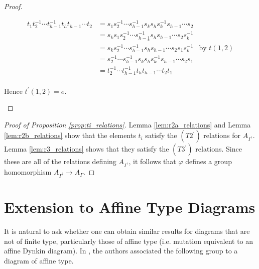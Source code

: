 \documentclass[11pt]{amsart}
\theoremstyle{definition}
\begin{document}
\begin{proof}
\begin{enumerate}[a)]
\begin{align*}
t_1t_2^{-1}\cdots t_{h-1}^{-1}t_ht_{h-1}\cdots t_2 &= s_1s_2^{-1}\cdots s_{h-1}^{-1}s_ks_hs_k^{-1}s_{h-1}\cdots s_2\\
&= s_k\underline{s_1s_2^{-1}\cdots s_{h-1}^{-1}s_hs_{h-1}\cdots s_2}s_k^{-1}\\
&= s_ks_2^{-1}\cdots s_{h-1}^{-1}s_hs_{h-1}\cdots s_2s_1s_k^{-1} &\text{by } t(1,2)\\
&= s_2^{-1}\cdots s_{h-1}^{-1}s_ks_hs_k^{-1}s_{h-1}\cdots s_2s_1\\
&= t_2^{-1}\cdots t_{h-1}^{-1}t_ht_{h-1}\cdots t_2t_1\\
\end{align*}

\noindent Hence $t^\prime(1,2) = e$.
\end{enumerate}
\end{proof}


\begin{proof}[Proof of Proposition \ref{prop:ti_relations}]
Lemma \ref{lem:r2a_relations} and Lemma \ref{lem:r2b_relations} show that the elements $t_i$ satisfy the $(T2^\prime)$ relations for $A_{\Gamma^\prime}$. Lemma \ref{lem:r3_relations} shows that they satisfy the $(T3^\prime)$ relations. Since these are all of the relations defining $A_{\Gamma^\prime}$, it follows that $\varphi$ defines a group homomorphism $A_{\Gamma^\prime}\rightarrow A_\Gamma$.
\end{proof}

\section{Extension to Affine Type Diagrams} \label{sec:affine}
It is natural to ask whether one can obtain similar results for diagrams that are not of finite type, particularly those of affine type (i.e. mutation equivalent to an affine Dynkin diagram). In \cite{FT13}, the authors associated the following group to a diagram of affine type.
\end{document}
